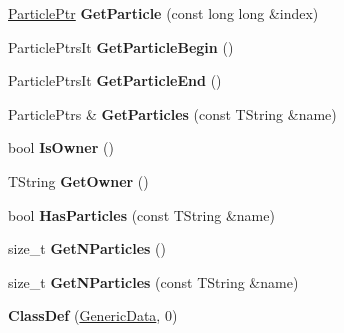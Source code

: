 \begin{DoxyCompactItemize}
\item 
\hypertarget{class_h_a_l_1_1_generic_data_a4956f4b4014bc1a7d32ad7399d622cba}{\hyperlink{class_h_a_l_1_1_generic_particle}{Particle\-Ptr} {\bfseries Get\-Particle} (const long long \&index)}\label{class_h_a_l_1_1_generic_data_a4956f4b4014bc1a7d32ad7399d622cba}

\item 
\hypertarget{class_h_a_l_1_1_generic_data_a601843b8bfda4d43a99cd46069b19d6c}{Particle\-Ptrs\-It {\bfseries Get\-Particle\-Begin} ()}\label{class_h_a_l_1_1_generic_data_a601843b8bfda4d43a99cd46069b19d6c}

\item 
\hypertarget{class_h_a_l_1_1_generic_data_a98b91768f0b886ac87611be8c7c490cd}{Particle\-Ptrs\-It {\bfseries Get\-Particle\-End} ()}\label{class_h_a_l_1_1_generic_data_a98b91768f0b886ac87611be8c7c490cd}

\item 
\hypertarget{class_h_a_l_1_1_generic_data_a88a50155c0cdc7dd76d681dcfb45dfc4}{Particle\-Ptrs \& {\bfseries Get\-Particles} (const T\-String \&name)}\label{class_h_a_l_1_1_generic_data_a88a50155c0cdc7dd76d681dcfb45dfc4}

\item 
\hypertarget{class_h_a_l_1_1_generic_data_a265c6f842139f2f7c8a12ff82962a15d}{bool {\bfseries Is\-Owner} ()}\label{class_h_a_l_1_1_generic_data_a265c6f842139f2f7c8a12ff82962a15d}

\item 
\hypertarget{class_h_a_l_1_1_generic_data_a444b2f7bd6c6e8ba6d585088f194928f}{T\-String {\bfseries Get\-Owner} ()}\label{class_h_a_l_1_1_generic_data_a444b2f7bd6c6e8ba6d585088f194928f}

\item 
\hypertarget{class_h_a_l_1_1_generic_data_a05638e168b83e998c8d1c1b58cfef9d2}{bool {\bfseries Has\-Particles} (const T\-String \&name)}\label{class_h_a_l_1_1_generic_data_a05638e168b83e998c8d1c1b58cfef9d2}

\item 
\hypertarget{class_h_a_l_1_1_generic_data_a521637ed1d84af87cf0ef5432893576f}{size\-\_\-t {\bfseries Get\-N\-Particles} ()}\label{class_h_a_l_1_1_generic_data_a521637ed1d84af87cf0ef5432893576f}

\item 
\hypertarget{class_h_a_l_1_1_generic_data_a0d2533aa45faf37a56b820f2b3a0d7d5}{size\-\_\-t {\bfseries Get\-N\-Particles} (const T\-String \&name)}\label{class_h_a_l_1_1_generic_data_a0d2533aa45faf37a56b820f2b3a0d7d5}

\item 
\hypertarget{class_h_a_l_1_1_generic_data_a737f93b6a0d228a7a7b8146cf6e151ea}{{\bfseries Class\-Def} (\hyperlink{class_h_a_l_1_1_generic_data}{Generic\-Data}, 0)}\label{class_h_a_l_1_1_generic_data_a737f93b6a0d228a7a7b8146cf6e151ea}

\end{DoxyCompactItemize}
